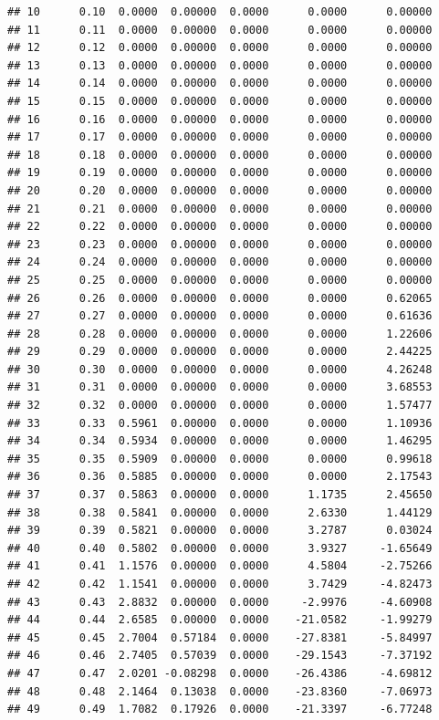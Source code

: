 \documentclass{article}\usepackage[]{graphicx}\usepackage[]{color}
\makeatletter
\newenvironment{kframe}{%
 \def\at@end@of@kframe{}%
 \ifinner\ifhmode%
  \def\at@end@of@kframe{\end{minipage}}%
  \begin{minipage}{\columnwidth}%
 \fi\fi%
 \def\FrameCommand##1{\hskip\@totalleftmargin \hskip-\fboxsep
 \colorbox{shadecolor}{##1}\hskip-\fboxsep
     \hskip-\linewidth \hskip-\@totalleftmargin \hskip\columnwidth}%
 \MakeFramed {\advance\hsize-\width
   \@totalleftmargin\z@ \linewidth\hsize
   \@setminipage}}%
 {\par\unskip\endMakeFramed%
 \at@end@of@kframe}
\newenvironment{knitrout}{}{} %
\makeatother
\begin{document}
\begin{knitrout}
\begin{kframe}
\begin{verbatim}
## 10      0.10  0.0000  0.00000  0.0000      0.0000      0.00000
## 11      0.11  0.0000  0.00000  0.0000      0.0000      0.00000
## 12      0.12  0.0000  0.00000  0.0000      0.0000      0.00000
## 13      0.13  0.0000  0.00000  0.0000      0.0000      0.00000
## 14      0.14  0.0000  0.00000  0.0000      0.0000      0.00000
## 15      0.15  0.0000  0.00000  0.0000      0.0000      0.00000
## 16      0.16  0.0000  0.00000  0.0000      0.0000      0.00000
## 17      0.17  0.0000  0.00000  0.0000      0.0000      0.00000
## 18      0.18  0.0000  0.00000  0.0000      0.0000      0.00000
## 19      0.19  0.0000  0.00000  0.0000      0.0000      0.00000
## 20      0.20  0.0000  0.00000  0.0000      0.0000      0.00000
## 21      0.21  0.0000  0.00000  0.0000      0.0000      0.00000
## 22      0.22  0.0000  0.00000  0.0000      0.0000      0.00000
## 23      0.23  0.0000  0.00000  0.0000      0.0000      0.00000
## 24      0.24  0.0000  0.00000  0.0000      0.0000      0.00000
## 25      0.25  0.0000  0.00000  0.0000      0.0000      0.00000
## 26      0.26  0.0000  0.00000  0.0000      0.0000      0.62065
## 27      0.27  0.0000  0.00000  0.0000      0.0000      0.61636
## 28      0.28  0.0000  0.00000  0.0000      0.0000      1.22606
## 29      0.29  0.0000  0.00000  0.0000      0.0000      2.44225
## 30      0.30  0.0000  0.00000  0.0000      0.0000      4.26248
## 31      0.31  0.0000  0.00000  0.0000      0.0000      3.68553
## 32      0.32  0.0000  0.00000  0.0000      0.0000      1.57477
## 33      0.33  0.5961  0.00000  0.0000      0.0000      1.10936
## 34      0.34  0.5934  0.00000  0.0000      0.0000      1.46295
## 35      0.35  0.5909  0.00000  0.0000      0.0000      0.99618
## 36      0.36  0.5885  0.00000  0.0000      0.0000      2.17543
## 37      0.37  0.5863  0.00000  0.0000      1.1735      2.45650
## 38      0.38  0.5841  0.00000  0.0000      2.6330      1.44129
## 39      0.39  0.5821  0.00000  0.0000      3.2787      0.03024
## 40      0.40  0.5802  0.00000  0.0000      3.9327     -1.65649
## 41      0.41  1.1576  0.00000  0.0000      4.5804     -2.75266
## 42      0.42  1.1541  0.00000  0.0000      3.7429     -4.82473
## 43      0.43  2.8832  0.00000  0.0000     -2.9976     -4.60908
## 44      0.44  2.6585  0.00000  0.0000    -21.0582     -1.99279
## 45      0.45  2.7004  0.57184  0.0000    -27.8381     -5.84997
## 46      0.46  2.7405  0.57039  0.0000    -29.1543     -7.37192
## 47      0.47  2.0201 -0.08298  0.0000    -26.4386     -4.69812
## 48      0.48  2.1464  0.13038  0.0000    -23.8360     -7.06973
## 49      0.49  1.7082  0.17926  0.0000    -21.3397     -6.77248

\end{verbatim}
\end{kframe}
\end{knitrout}
\end{document}
